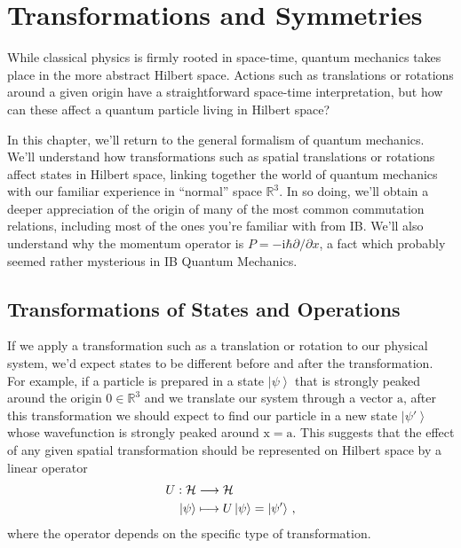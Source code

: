 \documentclass{article}
\theoremstyle{plain}\theoremheaderfont{\normalfont\itshape}\theorembodyfont{\rmfamily}\theoremseparator{.}\newtheorem*{rem}{Remark}\newtheorem*{ex}{Example}\newtheorem*{proof}{Proof}\newtheorem*{altp}{Alternative proof}
\theoremstyle{plain}\theoremheaderfont{\normalfont\bfseries}\theorembodyfont{\rmfamily}\theoremseparator{.}\newtheorem{thm}{Theorem}[section]\newtheorem{lem}[thm]{Lemma}\newtheorem{prop}[thm]{Proposition}\newtheorem*{cor}{Corollary}\newtheorem{defn}[thm]{Definition}\newtheorem{clm}[thm]{Claim}\newtheorem{clminproof}{Claim}
\theoremstyle{break}\theoremheaderfont{\normalfont\itshape}\theorembodyfont{\rmfamily}\theoremseparator{.\medskip}\newtheorem*{proofskip}{Proof}\newtheorem*{exs}{Examples}\newtheorem*{rems}{Remarks}
\theoremstyle{break}\theoremheaderfont{\normalfont\bfseries}\theorembodyfont{\rmfamily}\theoremseparator{.\medskip}\newtheorem{lemskip}[thm]{Lemma}\newtheorem{defnskip}[thm]{Definition}\newtheorem{propskip}[thm]{Proposition}\newtheorem{thmskip}[thm]{Theorem}
\numberwithin{equation}{section}
\newcommand{\ii}{\mathrm{i}}
\newcommand{\ket}[1]{\left| #1 \right\rangle}
\newcommand{\vb}[1]{\bm{\mathrm{#1}}}
\newcommand{\hb}{\mathcal{H}}
\newcommand{\RR}{\mathbb{R}}
\begin{document}
    \newpage
    \section{Transformations and Symmetries}
    While classical physics is firmly rooted in space-time, quantum mechanics takes place in  the more abstract Hilbert space. Actions such as translations or rotations around a given origin have a straightforward space-time interpretation, but how can these affect a quantum particle living in Hilbert space?

    In this chapter, we'll return to the general formalism of quantum mechanics. We'll understand how transformations such as spatial translations or rotations affect states in Hilbert space, linking together the world of quantum mechanics with our familiar experience in ``normal'' space \(\RR^3\). In so doing, we'll obtain a deeper appreciation of the origin of many of the most common commutation relations, including most of the ones you're familiar with from IB. We'll also understand why the momentum operator is \(P=-\ii\hbar\partial/\partial x\), a fact which probably seemed rather mysterious in IB Quantum Mechanics.

    \subsection{Transformations of States and Operations}
    If we apply a transformation such as a translation or rotation to our physical system, we'd expect states to be different before and after the transformation. For example, if a particle is prepared in a state \(\ket{\psi}\) that is strongly peaked around the origin \(\vb{0}\in\RR^3\) and we translate our system through a vector \(\vb{a}\), after this transformation we should expect to find our particle in a new state \(\ket{\psi'}\) whose wavefunction is strongly peaked around \(\vb{x}=\vb{a}\). This suggests that the effect of any given spatial transformation should be represented on Hilbert space by a linear operator
    \begin{align}
        U:\hb&\longrightarrow\hb\notag\\
        \ket{\psi}&\longmapsto U\ket{\psi}=\ket{\psi'}\,,
    \end{align}
    where the operator depends on the specific type of transformation.
\end{document}
